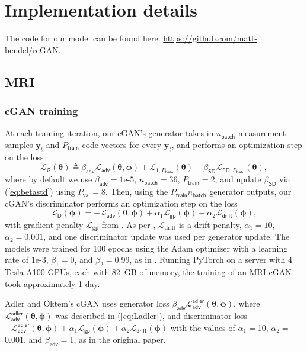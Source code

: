 \documentclass{article}
\theoremstyle{plain}
\theoremstyle{definition}
\theoremstyle{remark}
\newcommand{\defn}{\triangleq}
\renewcommand{\vec}[1]{\ensuremath{\boldsymbol{#1}}}
\newcommand{\mc}[1]{\ensuremath{\mathcal{#1}}}
\newcommand{\Ell}{\mathcal{L}}
\renewcommand{\eqref}[1]{(\ref{eq:#1})}
\newcommand{\batch}{_{\mathsf{batch}}}
\newcommand{\train}{_{\mathsf{train}}}
\newcommand{\val}{_{\mathsf{val}}}
\newcommand{\Ladler}{\mc{L}^{\mathsf{adler}}_{\mathsf{adv}}}
\newcommand{\Ladv}{\mc{L}_{\mathsf{adv}}}
\newcommand{\Lgp}{\mc{L}_{\mathsf{gp}}}
\newcommand{\Ldrift}{\mc{L}_{\mathsf{drift}}}
\newcommand{\LonePt}{\mc{L}_{1,P\train}}
\newcommand{\LstdPt}{\mc{L}_{\mathsf{SD},P\train}}
\newcommand{\betaadv}{\beta_{\mathsf{adv}}}
\newcommand{\betastd}{\beta_{\mathsf{SD}}}
\begin{document}
\section{Implementation details} \label{app:implementation}
The code for our model can be found here: \url{https://github.com/matt-bendel/rcGAN}.

\subsection{MRI} \label{app:mriarchitecture}

\subsubsection{cGAN training} 

At each training iteration, our cGAN's generator takes in $n\batch$ measurement samples $\vec{y}_t$ and $P\train$ code vectors for every $\vec{y}_t$, and performs an optimization step on the loss
\begin{equation}
\Ell_{\mathsf{G}}(\vec{\theta}) 
\defn \betaadv \Ladv(\vec{\theta},\vec{\phi}) + \LonePt(\vec{\theta}) - \betastd\LstdPt(\vec{\theta})
\label{eq:genloss} ,
\end{equation}
where by default we use $\betaadv = 1\text{e-5}$, $n\batch=36$, $P\train=2$, and update $\betastd$ via \eqref{betastd} using $P\val=8$.
Then, using the $P\train n\batch$ generator outputs, our cGAN's discriminator performs an optimization step on the loss
\begin{equation}
\Ell_{\mathsf{D}}(\vec{\phi}) = -\Ladv(\vec{\theta},\vec{\phi}) + \alpha_1 \Lgp(\vec{\phi}) + \alpha_2 \Ldrift(\vec{\phi})
\label{eq:dloss} ,
\end{equation}
with gradient penalty $\Ell_\text{gp}$ from \cite{Gulrajani:NIPS:17}. 
As per \cite{Karras:ICLR:18}, $\Ell_\text{drift}$ is a drift penalty, $\alpha_1 = 10$, $\alpha_2 = 0.001$, and one discriminator update was used per generator update.
The models were trained for 100 epochs using the Adam optimizer \cite{Kingma:ICLR:15} with a learning rate of 1e-3, $\beta_1=0$, and $\beta_2=0.99$, as in \cite{Karras:ICLR:18}.
Running PyTorch on a server with 4 Tesla A100 GPUs, each with 82~GB of memory, the training of an MRI cGAN took approximately 1 day.

Adler and \"Oktem's cGAN \cite{Adler:18} uses generator loss $\betaadv\Ladler(\vec{\theta},\vec{\phi})$, where $\Ladler(\vec{\theta},\vec{\phi})$ was described in \eqref{Ladler}, and discriminator loss $-\Ladler(\vec{\theta},\vec{\phi})+ \alpha_1 \Lgp(\vec{\phi}) + \alpha_2 \Ldrift(\vec{\phi})$ 
with the values of $\alpha_1=$10, $\alpha_2=$0.001, and $\betaadv=$1, as in the original paper. 
\end{document}
